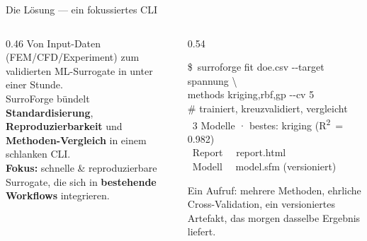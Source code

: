 \documentclass[aspectratio=169,11pt]{beamer}
\newcommand{\rarr}{\textcolor{sfslate}{\,\textrightarrow\,}}
\newcommand{\cmark}{\textcolor{sfaccent}{\ding{51}}}
\newcommand{\Rsq}{R\textsuperscript{2}}
\begin{document}
\begin{frame}[t]{Die Lösung — ein fokussiertes CLI}
  \begin{columns}[t]
    \begin{column}{0.46\textwidth}
      {\small Von Input-Daten (FEM/CFD/Experiment) zum validierten
      ML-Surrogate in unter einer Stunde.}\\[10pt]
      {\small SurroForge bündelt \textbf{Standardisierung}, \textbf{Reproduzierbarkeit}
      und \textbf{Methoden-Vergleich} in einem schlanken CLI.}\\[10pt]
      {\small\textbf{Fokus:} schnelle \& reproduzierbare Surrogate, die sich in
      \textbf{bestehende Workflows} integrieren.}
    \end{column}
    \begin{column}{0.54\textwidth}
      \begin{terminal}
        \ttfamily\scriptsize\color{termfg}
        \textcolor{sfamber}{\$}\ surroforge fit doe.csv {-}{-}target spannung \textbackslash\\
        \hspace{1.4em}{-}{-}methods kriging,rbf,gp {-}{-}cv 5\\[6pt]
        \color{sfmute}\# trainiert, kreuzvalidiert, vergleicht\\[6pt]
        \cmark\ 3 Modelle · bestes: \textcolor{termfg}{kriging} (\Rsq\ = 0.982)\\
        \cmark\ Report\ \rarr\ report.html\\
        \cmark\ Modell\ \rarr\ model.sfm \textcolor{sfmute}{(versioniert)}
      \end{terminal}
      \vspace{2pt}
      {\scriptsize\color{sfslate}Ein Aufruf: mehrere Methoden, ehrliche Cross-Validation,
      ein versioniertes Artefakt, das morgen dasselbe Ergebnis liefert.}
    \end{column}
  \end{columns}
\end{frame}
\end{document}
